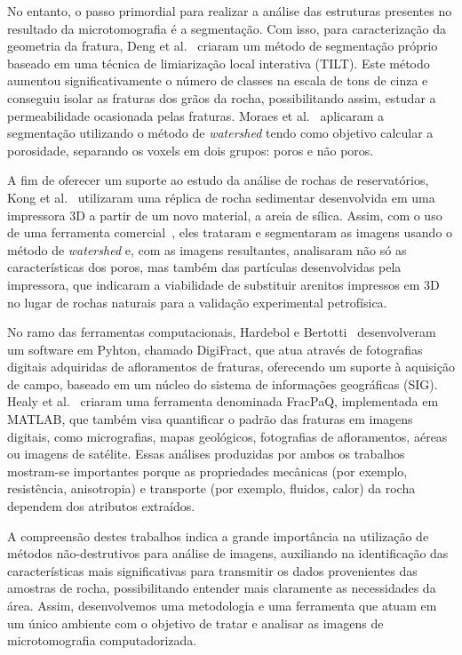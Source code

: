 \documentclass[a4paper,10pt,twocolumn,twoside]{article}
\begin{document}
No entanto, o passo primordial para realizar a análise das estruturas presentes no resultado da microtomografia é a segmentação. Com isso, para caracterização da geometria da fratura, Deng et al.~\cite{deng2016quantifying} criaram um método de segmentação próprio baseado em uma técnica de limiarização local interativa (TILT). Este método aumentou significativamente o número de classes na escala de tons de cinza e conseguiu isolar as fraturas dos grãos da rocha, possibilitando assim, estudar a permeabilidade ocasionada pelas fraturas. Moraes et al.~\cite{moraes2018determinaccao} aplicaram a segmentação utilizando o método de \textit{watershed} tendo como objetivo calcular a porosidade, separando os voxels em dois grupos: poros e não poros.

A fim de oferecer um suporte ao estudo da análise de rochas de reservatórios, Kong et al.~\cite{kong2019microstructure} utilizaram uma réplica de rocha sedimentar desenvolvida em uma impressora 3D a partir de um novo material, a areia de sílica. Assim, com o uso de uma ferramenta comercial~\cite{Avizo}, eles trataram e segmentaram as imagens usando o método de \textit{watershed} e, com as imagens resultantes, analisaram não só as características dos poros, mas também das partículas desenvolvidas pela impressora, que indicaram a viabilidade de substituir arenitos impressos em 3D no lugar de rochas naturais para a validação experimental petrofísica.

No ramo das ferramentas computacionais, Hardebol e Bertotti~\cite{hardebol2013digifract} desenvolveram um software em Pyhton, chamado DigiFract, que atua através de fotografias digitais adquiridas de afloramentos de fraturas, oferecendo um suporte à aquisição de campo, baseado em um núcleo do sistema de informações geográficas (SIG). Healy et al.~\cite{healy2017fracpaq} criaram uma ferramenta denominada FracPaQ, implementada em MATLAB, que também visa quantificar o padrão das fraturas em imagens digitais, como micrografias, mapas geológicos, fotografias de afloramentos, aéreas ou imagens de satélite. Essas análises produzidas por ambos os trabalhos mostram-se importantes porque as propriedades mecânicas (por exemplo, resistência, anisotropia) e transporte (por exemplo, fluidos, calor) da rocha dependem dos atributos extraídos.

A compreensão destes trabalhos indica a grande importância na utilização de métodos não-destrutivos para análise de imagens, auxiliando na identificação das características mais significativas para transmitir os dados provenientes das amostras de rocha, possibilitando entender mais claramente as necessidades da área. Assim, desenvolvemos uma metodologia e uma ferramenta que atuam em um único ambiente com o objetivo de tratar e analisar as imagens de microtomografia computadorizada.
\end{document}
